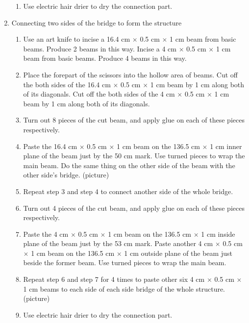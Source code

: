 \begin{enumerate}
\begin{enumerate}
	\item Use electric hair drier to dry the connection part.
	\end{enumerate}
\item Connecting two sides of the bridge to form the structure
	\begin{enumerate}
	\item Use an art knife to incise a 16.4 cm $\times$ 0.5 cm $\times$ 1 cm beam from basic beams. Produce 2 beams in this way. Incise a 4 cm $\times$ 0.5 cm $\times$ 1 cm beam from basic beams. Produce 4 beams in this way.
	\item Place the forepart of the scissors into the hollow area of beams. Cut off the both sides of the 16.4 cm $\times$ 0.5 cm $\times$ 1 cm beam by 1 cm along both of its diagonals. Cut off the both sides of the 4 cm $\times$ 0.5 cm $\times$ 1 cm beam by 1 cm along both of its diagonals.
	\item Turn out 8 pieces of the cut beam, and apply glue on each of these pieces respectively. 
	\item Paste the 16.4 cm $\times$ 0.5 cm $\times$ 1 cm beam on the 136.5 cm  $\times$ 1 cm inner plane of the beam just by the 50 cm mark. Use turned pieces to wrap the main beam. Do the same thing on the other side of the beam with the other side’s bridge.
	(picture) 
	\item Repeat step 3 and step 4 to connect another side of the whole bridge.
	\item Turn out 4 pieces of the cut beam, and apply glue on each of these pieces respectively. 
	\item Paste the 4 cm $\times$ 0.5 cm $\times$ 1 cm beam on the 136.5 cm  $\times$ 1 cm inside plane of the beam just by the 53 cm mark. Paste another 4 cm $\times$ 0.5 cm $\times$ 1 cm beam on the 136.5 cm  $\times$ 1 cm outside plane of the beam just beside the former beam. Use turned pieces to wrap the main beam. 
	\item Repeat step 6 and step 7 for 4 times to paste other six 4 cm $\times$ 0.5 cm $\times$ 1 cm beams to each side of each side bridge of the whole structure. 
	(picture)
	\item Use electric hair drier to dry the connection part. 
	\end{enumerate}
\end{enumerate}

%
%

